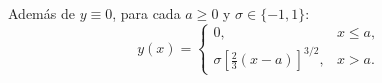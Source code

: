 Además de $y\equiv0$, para cada $a\ge0$ y $\sigma\in\{-1,1\}$:
\[y(x)=\begin{cases}0,&x\le a,\\ \sigma[\tfrac23(x-a)]^{3/2},&x>a.\end{cases}\]
